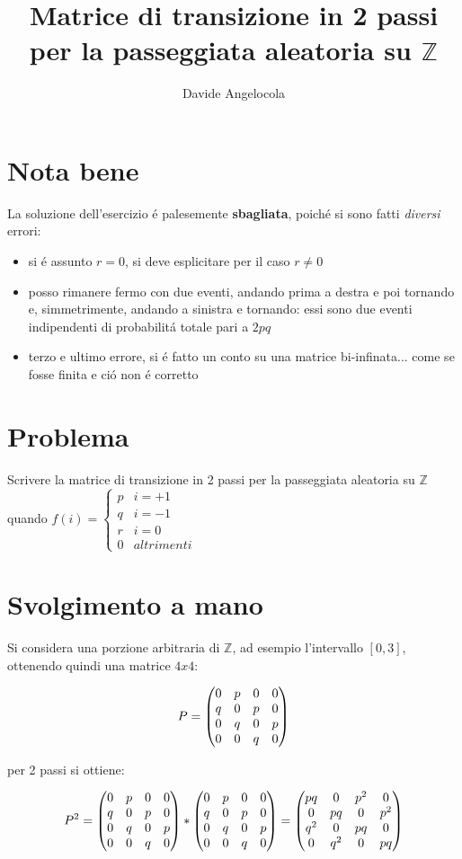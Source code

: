 \documentclass{article}
\title{Matrice di transizione in 2 passi per la passeggiata aleatoria su $\mathbb{Z}$}
\author{Davide Angelocola}
\begin{document}
\maketitle

\section{Nota bene}
La soluzione dell'esercizio \'{e} palesemente \textbf{sbagliata}, poich\'{e} si sono fatti \textsl{diversi} errori:
\begin{itemize}
    \item si \'{e} assunto $r=0$, si deve esplicitare per il caso $r\neq0$
    \item posso rimanere fermo con due eventi, andando prima a destra e poi tornando e, simmetrimente, andando a sinistra e tornando: essi sono due eventi indipendenti di probabilit\'{a} totale pari a $2pq$
    \item terzo e ultimo errore, si \'{e} fatto un conto su una matrice bi-infinata... come se fosse finita e ci\'{o} non \'{e} corretto
\end{itemize}

\section{Problema}
Scrivere la matrice di transizione in 2 passi per la passeggiata aleatoria su  $\mathbb{Z}$ quando $f(i)= \begin{cases}
	p & i = +1     \\
	q & i = -1     \\
	r & i = 0      \\
	0 & altrimenti 
	\end{cases}
$

\section{Svolgimento a mano}

Si considera una porzione arbitraria di $\mathbb{Z}$, ad esempio l'intervallo $[0, 3]$, ottenendo quindi una matrice $4x4$:

$$P = \begin{pmatrix}0 & p & 0 & 0\cr q & 0 & p & 0\cr 0 & q & 0 & p \cr 0 & 0 & q & 0 \end{pmatrix}$$

per 2 passi si ottiene:

$$P^2 = \begin{pmatrix}0 & p & 0 & 0\cr q & 0 & p & 0\cr 0 & q & 0 & p \cr 0 & 0 & q & 0 \end{pmatrix} * \begin{pmatrix}0 & p & 0 & 0\cr q & 0 & p & 0\cr 0 & q & 0 & p \cr 0 & 0 & q & 0 \end{pmatrix} = \begin{pmatrix}pq & 0 & p^2 & 0\cr 0 & pq & 0 & p^2\cr q^2 & 0 & pq & 0 \cr 0 & q^2 & 0 & pq \end{pmatrix} $$
\end{document}
